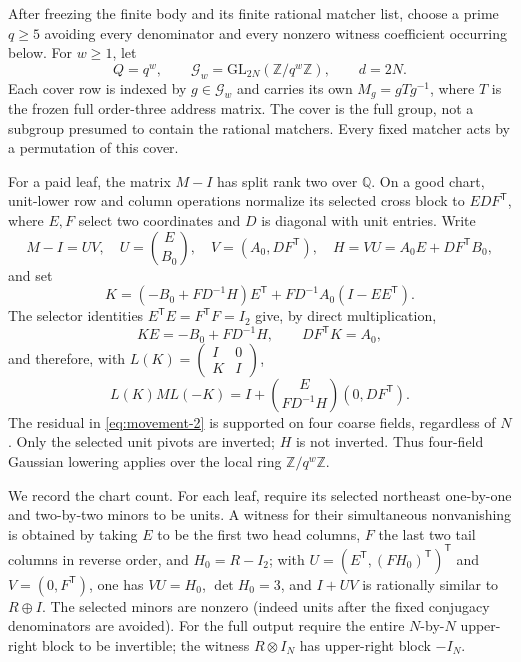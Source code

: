 After freezing the finite body and its finite rational matcher list,
choose a prime $q\ge5$ avoiding every denominator and every nonzero
witness coefficient occurring below. For $w\ge1$, let
\[
 Q=q^w,\qquad \mathcal G_w=\mathrm{GL}_{2N}(\mathbb Z/q^w\mathbb Z),
 \qquad d=2N.
\]
Each cover row is indexed by $g\in\mathcal G_w$ and carries its own
$M_g=gTg^{-1}$, where $T$ is the frozen full order-three address matrix.
The cover is the full group, not a subgroup presumed to contain the
rational matchers. Every fixed matcher acts by a permutation of this
cover.

For a paid leaf, the matrix $M-I$ has split rank two over $\mathbb Q$.
On a good chart, unit-lower row and column operations normalize its
selected cross block to $ED F^{\mathsf T}$, where $E,F$ select two
coordinates and $D$ is diagonal with unit entries. Write
\[
 M-I=UV,\quad U=\binom{E}{B_0},\quad V=(A_0,DF^{\mathsf T}),
 \quad H=VU=A_0E+DF^{\mathsf T}B_0,
\]
and set
\[
 K=(-B_0+FD^{-1}H)E^{\mathsf T}
       +FD^{-1}A_0(I-EE^{\mathsf T}).
\]
The selector identities $E^{\mathsf T}E=F^{\mathsf T}F=I_2$ give,
by direct multiplication,
\[
 KE=-B_0+FD^{-1}H,\qquad DF^{\mathsf T}K=A_0,
\]
and therefore, with $L(K)=\left(\begin{smallmatrix}I&0\\K&I\end{smallmatrix}\right)$,
\begin{equation}
 L(K)ML(-K)=I+
 \binom{E}{FD^{-1}H}(0,DF^{\mathsf T}).             \label{eq:movement-2}
\end{equation}
The residual in \eqref{eq:movement-2} is supported on four coarse fields, regardless
of $N$. Only the selected unit pivots are inverted; $H$ is not inverted.
Thus four-field Gaussian lowering applies over the local ring
$\mathbb Z/q^w\mathbb Z$.

We record the chart count. For each leaf, require its selected northeast
one-by-one and two-by-two minors to be units. A witness for their
simultaneous nonvanishing is obtained by taking $E$ to be the first two
head columns, $F$ the last two tail columns in reverse order, and
$H_0=R-I_2$; with $U=(E^{\mathsf T},(FH_0)^{\mathsf T})^{\mathsf T}$ and
$V=(0,F^{\mathsf T})$, one has $VU=H_0$, $\det H_0=3$, and
$I+UV$ is rationally similar to $R\oplus I$. The selected minors are
nonzero (indeed units after the fixed conjugacy denominators are avoided).
For the full output require the entire $N$-by-$N$ upper-right block to
be invertible; the witness $R\otimes I_N$ has upper-right block
$-I_N$.

